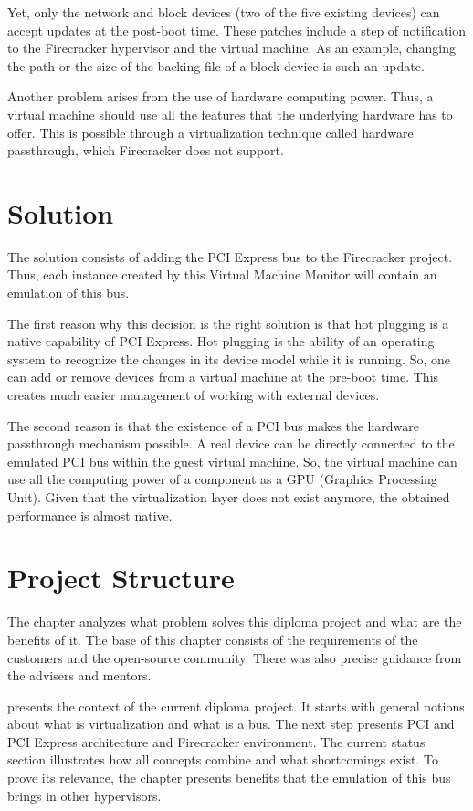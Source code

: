 \documentclass[12pt, a4paper]{report}
\begin{document}
Yet, only the network and block devices (two of the five existing devices) can accept updates at the post-boot time. These patches include a step of notification to the Firecracker hypervisor and the virtual machine. As an example, changing the path or the size of the backing file of a block device is such an update.

Another problem arises from the use of hardware computing power. Thus, a virtual machine should use all the features that the underlying hardware has to offer. This is possible through a virtualization technique called hardware passthrough, which Firecracker does not support.

\section{Solution}

The solution consists of adding the PCI Express bus to the Firecracker project. Thus, each instance created by this Virtual Machine Monitor will contain an emulation of this bus.

The first reason why this decision is the right solution is that hot plugging is a native capability of PCI Express. Hot plugging is the ability of an operating system to recognize the changes in its device model while it is running. So, one can add or remove devices from a virtual machine at the pre-boot time. This creates much easier management of working with external devices.

The second reason is that the existence of a PCI bus makes the hardware passthrough mechanism possible. A real device can be directly connected to the emulated PCI bus within the guest virtual machine. So, the virtual machine can use all the computing power of a component as a GPU (Graphics Processing Unit). Given that the virtualization layer does not exist anymore, the obtained performance is almost native.

\section{Project Structure}

The  chapter analyzes what problem solves this diploma project and what are the benefits of it. The base of this chapter consists of the requirements of the customers and the open-source community. There was also precise guidance from the advisers and mentors.

 presents the context of the current diploma project. It starts with general notions about what is virtualization and what is a bus. The next step presents PCI and PCI Express architecture and Firecracker environment. The current status section illustrates how all concepts combine and what shortcomings exist. To prove its relevance, the  chapter presents benefits that the emulation of this bus brings in other hypervisors.
\end{document}
